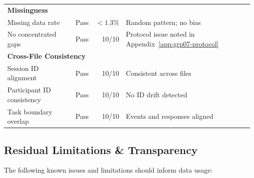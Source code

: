 \documentclass[11pt,a4paper]{article}
\begin{document}
\begin{table}[htb]
\begin{tabular}{lrrl}
    \multicolumn{4}{l}{\textbf{Missingness}} \\
    Missing data rate & Pass & $< 1.3\%$ & Random pattern; no bias \\
    No concentrated gaps & Pass & 10/10 & Protocol issue noted in Appendix~\ref{app:grp07-protocol} \\[3pt]
    \multicolumn{4}{l}{\textbf{Cross-File Consistency}} \\
    Session ID alignment & Pass & 10/10 & Consistent across files \\
    Participant ID consistency & Pass & 10/10 & No ID drift detected \\
    Task boundary overlap & Pass & 10/10 & Events and responses aligned \\
    \bottomrule
  \end{tabular}
\end{table}

\subsection{Residual Limitations \& Transparency}
\label{sec:qc-limitations}

The following known issues and limitations should inform data usage:
\end{document}
